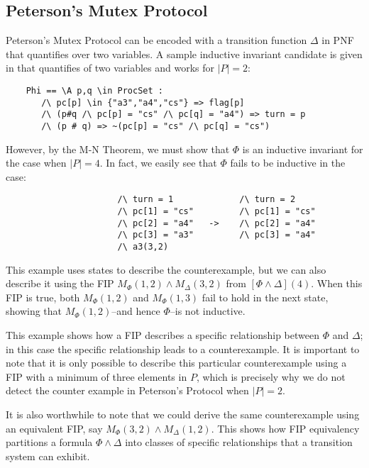 \documentclass[12pt]{article}
\theoremstyle{definition}
\theoremstyle{remark}
\begin{document}
\subsection{Peterson's Mutex Protocol}
Peterson's Mutex Protocol can be encoded with a transition function $\Delta$ in PNF that quantifies over two variables.  A sample inductive invariant candidate is given in \cite{ian-peterson} that quantifies of two variables and works for $|P|=2$:
\begin{verbatim}
    Phi == \A p,q \in ProcSet :
       /\ pc[p] \in {"a3","a4","cs"} => flag[p]
       /\ (p#q /\ pc[p] = "cs" /\ pc[q] = "a4") => turn = p
       /\ (p # q) => ~(pc[p] = "cs" /\ pc[q] = "cs")
\end{verbatim}
However, by the M-N Theorem, we must show that $\Phi$ is an inductive invariant for the case when $|P|=4$.  In fact, we easily see that $\Phi$ fails to be inductive in the case:
\begin{verbatim}
                      /\ turn = 1             /\ turn = 2
                      /\ pc[1] = "cs"         /\ pc[1] = "cs"
                      /\ pc[2] = "a4"   ->    /\ pc[2] = "a4"
                      /\ pc[3] = "a3"         /\ pc[3] = "a4"
                      /\ a3(3,2)
\end{verbatim}
This example uses states to describe the counterexample, but we can also describe it using the FIP $M_{\Phi}(1,2) \land M_{\Delta}(3,2)$ from $[\Phi\land\Delta](4)$.  When this FIP is true, both $M_{\Phi}(1,2)$ and $M_{\Phi}(1,3)$ fail to hold in the next state, showing that $M_{\Phi}(1,2)$--and hence $\Phi$--is not inductive.

This example shows how a FIP describes a specific relationship between $\Phi$ and $\Delta$; in this case the specific relationship leads to a counterexample.  It is important to note that it is only possible to describe this particular counterexample using a FIP with a minimum of three elements in $P$, which is precisely why we do not detect the counter example in Peterson's Protocol when $|P|=2$.

It is also worthwhile to note that we could derive the same counterexample using an equivalent FIP, say $M_{\Phi}(3,2) \land M_{\Delta}(1,2)$.  This shows how FIP equivalency partitions a formula $\Phi\land\Delta$ into classes of specific relationships that a transition system can exhibit.




\end{document}
